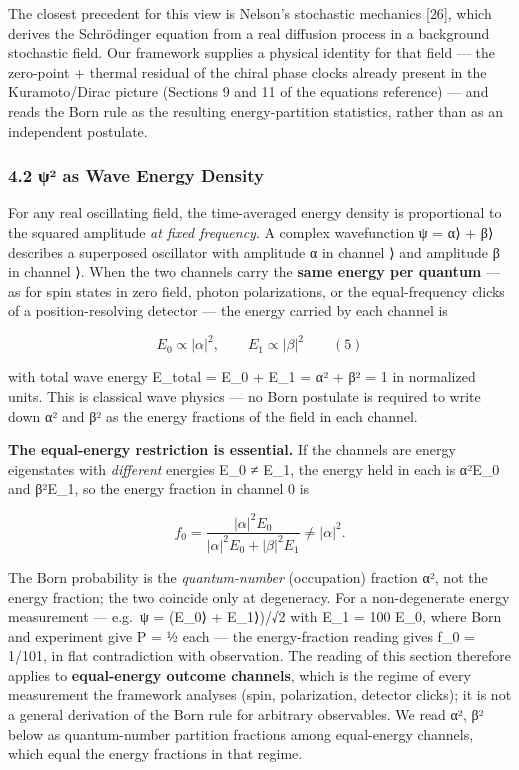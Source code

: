 \documentclass[
]{article}
\begin{document}
The closest precedent for this view is Nelson's stochastic mechanics
{[}26{]}, which derives the Schrödinger equation from a real diffusion
process in a background stochastic field. Our framework supplies a
physical identity for that field --- the zero-point + thermal residual
of the chiral phase clocks already present in the Kuramoto/Dirac picture
(Sections 9 and 11 of the equations reference) --- and reads the Born
rule as the resulting energy-partition statistics, rather than as an
independent postulate.

\subsubsection{4.2 \textbar ψ\textbar² as Wave Energy
Density}\label{ux3c8uxb2-as-wave-energy-density}

For any real oscillating field, the time-averaged energy density is
proportional to the squared amplitude \emph{at fixed frequency}. A
complex wavefunction ψ = α⟩ + β⟩ describes a
superposed oscillator with amplitude α in channel ⟩ and
amplitude β in channel ⟩. When the two channels carry the
\textbf{same energy per quantum} --- as for spin states in zero field,
photon polarizations, or the equal-frequency clicks of a
position-resolving detector --- the energy carried by each channel is

\[E_0 \propto |\alpha|^2, \qquad E_1 \propto |\beta|^2 \qquad (5)\]

with total wave energy E\_total = E\_0 + E\_1 = \textbar α\textbar² +
\textbar β\textbar² = 1 in normalized units. This is classical wave
physics --- no Born postulate is required to write down
\textbar α\textbar² and \textbar β\textbar² as the energy fractions of
the field in each channel.

\textbf{The equal-energy restriction is essential.} If the channels are
energy eigenstates with \emph{different} energies E\_0 ≠ E\_1, the
energy held in each is \textbar α\textbar²E\_0 and
\textbar β\textbar²E\_1, so the energy fraction in channel 0 is

\[f_0 = \frac{|\alpha|^2 E_0}{|\alpha|^2 E_0 + |\beta|^2 E_1} \neq |\alpha|^2 .\]

The Born probability is the \emph{quantum-number} (occupation) fraction
\textbar α\textbar², not the energy fraction; the two coincide only at
degeneracy. For a non-degenerate energy measurement --- e.g.~ψ =
(\textbar E\_0⟩ + \textbar E\_1⟩)/√2 with E\_1 = 100 E\_0, where Born
and experiment give P = ½ each --- the energy-fraction reading gives
f\_0 = 1/101, in flat contradiction with observation. The reading of
this section therefore applies to \textbf{equal-energy outcome
channels}, which is the regime of every measurement the framework
analyses (spin, polarization, detector clicks); it is not a general
derivation of the Born rule for arbitrary observables. We read
\textbar α\textbar², \textbar β\textbar² below as quantum-number
partition fractions among equal-energy channels, which equal the energy
fractions in that regime.
\end{document}
